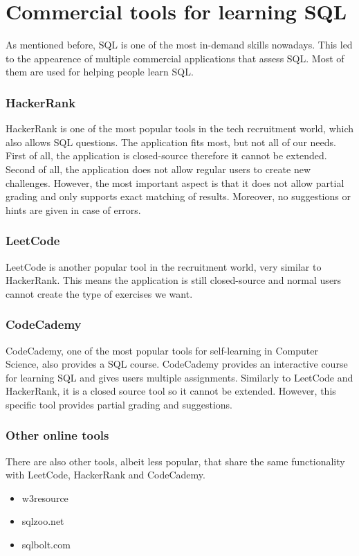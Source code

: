 \section{Commercial tools for learning SQL} \label{ch:lit:sec:tutor:comercial}

As mentioned before, SQL is one of the most in-demand skills
nowadays. This led to the appearence of multiple commercial 
applications that assess SQL. Most of them are used for helping people
learn SQL.

\subsubsection{HackerRank}
HackerRank is one of the most popular tools in the tech recruitment world,
which also allows SQL questions. The application fits most, but not all of our
needs. First of all, the application is closed-source therefore it cannot be extended. Second of all, the application does not allow regular
users to create new challenges. However, the most important aspect is
that it does not allow partial grading and only supports exact matching
of results. Moreover, no suggestions or hints are given in case of errors.

\subsubsection{LeetCode}
LeetCode is another popular tool in the recruitment world, very similar to
HackerRank. This means the application is still closed-source and
normal users cannot create the type of exercises we want.

\subsubsection{CodeCademy}
CodeCademy, one of the most popular tools for self-learning in Computer
Science, also provides a SQL course. CodeCademy provides an interactive
course for learning SQL and gives users multiple assignments.
Similarly to LeetCode and HackerRank, it is a closed source tool so it cannot be
extended. However, this specific tool provides partial grading and suggestions.

\subsubsection{Other online tools}
There are also other tools, albeit less popular, that share the same functionality with LeetCode, HackerRank and CodeCademy.
\begin{itemize}
    \item w3resource
    \item sqlzoo.net
    \item sqlbolt.com
\end{itemize}

